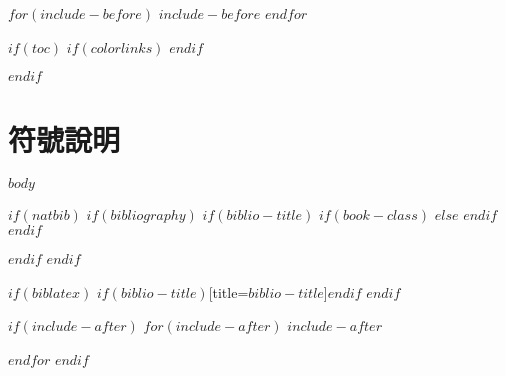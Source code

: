 \documentclass[$if(fontsize)$$fontsize$,$endif$$if(lang)$$babel-lang$,$endif$$if(papersize)$$papersize$paper,$endif$$for(classoption)$$classoption$$sep$,$endfor$]{$documentclass$}
\renewcommand{\chaptername}{}
\renewcommand{\thechapter}{第\zhnum{chapter}章}
\renewcommand{\thesection}{\arabic{chapter}.\arabic{section}}
\renewcommand{\thesubsection}{\arabic{chapter}.\arabic{section}.\arabic{subsection}}
\begin{document}
$for(include-before)$
$include-before$
$endfor$

$if(toc)$
\begingroup
    \renewcommand{\contentsname}{\center 目錄 \addcontentsline{toc}{chapter}{目錄}}
    \renewcommand{\numberline}[1]{~#1\hspace*{1em}}
    $if(colorlinks)$
    \hypersetup{linkcolor=$if(toccolor)$$toccolor$$else$black$endif$}
    $endif$
    \setcounter{tocdepth}{$toc-depth$}
    \tableofcontents
    \newcommand{\lotlabel}{表}
    \renewcommand{\listtablename}{\center 表目錄 \addcontentsline{toc}{chapter}{表目錄}}
    \renewcommand{\numberline}[1]{\lotlabel~#1\hspace*{1em}}
    \listoftables
    \newcommand{\loflabel}{圖}
    \renewcommand{\listfigurename}{\center 圖目錄 \addcontentsline{toc}{chapter}{圖目錄}}
    \renewcommand{\numberline}[1]{\loflabel~#1\hspace*{1em}}
    \listoffigures
\endgroup
$endif$

\chapter*{符號說明}
\fontsize{14}{21}\selectfont{$symbols$}

\mainmatter
$body$

$if(natbib)$
$if(bibliography)$
    \renewcommand{\chaptername}{}
    \renewcommand{\thechapter}{}
    $if(biblio-title)$
        $if(book-class)$
        \renewcommand\bibname{$biblio-title$}
        $else$
        \renewcommand\refname{$biblio-title$}
        $endif$
    $endif$
    
$endif$
$endif$

$if(biblatex)$
\printbibliography$if(biblio-title)$[title=$biblio-title$]$endif$
$endif$


$if(include-after)$
\setcounter{appendix_counter}{1}
\renewcommand{\thechapter}{附錄\zhnum{appendix_counter}}
\renewcommand{\thesection}{\arabic{section}.}
\renewcommand{\thesubsection}{\arabic{section}-\arabic{subsection}}
$for(include-after)$
\newpage
$include-after$
\addtocounter{appendix_counter}{1}
$endfor$
$endif$

\end{document}
